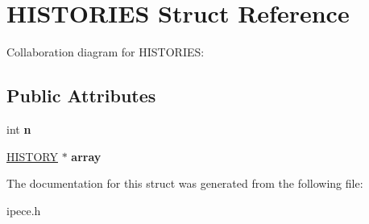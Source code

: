 \hypertarget{struct_h_i_s_t_o_r_i_e_s}{\section{H\-I\-S\-T\-O\-R\-I\-E\-S Struct Reference}
\label{struct_h_i_s_t_o_r_i_e_s}
}


Collaboration diagram for H\-I\-S\-T\-O\-R\-I\-E\-S\-:
\subsection*{Public Attributes}
\begin{DoxyCompactItemize}
\item 
\hypertarget{struct_h_i_s_t_o_r_i_e_s_aecceefb5d66e6eff1d4ec5b13349ee90}{int {\bfseries n}}\label{struct_h_i_s_t_o_r_i_e_s_aecceefb5d66e6eff1d4ec5b13349ee90}

\item 
\hypertarget{struct_h_i_s_t_o_r_i_e_s_a6a7605258c974fb4445591afc67e9fc8}{\hyperlink{struct_h_i_s_t_o_r_y}{H\-I\-S\-T\-O\-R\-Y} $\ast$ {\bfseries array}}\label{struct_h_i_s_t_o_r_i_e_s_a6a7605258c974fb4445591afc67e9fc8}

\end{DoxyCompactItemize}


The documentation for this struct was generated from the following file\-:\begin{DoxyCompactItemize}
\item 
ipece.\-h\end{DoxyCompactItemize}
